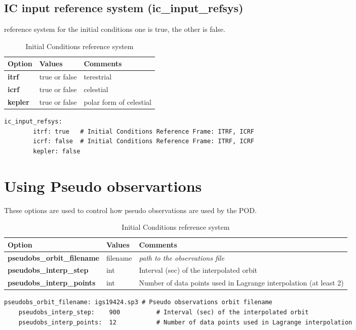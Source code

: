 \subsection{IC input reference system (ic\_input\_refsys)}
reference system for the initial conditions one is true, the other is false. 
\begin{table}[h!]
	\begin{tabular}{|p{4.5cm}|p{2cm}|p{3.5cm}|}
		\hline
		Option & Values & Comments \\
		\hline
		\textbf{itrf} & true or false & terestrial\\
		\textbf{icrf} & true or false & celestial \\
		\textbf{kepler} & true or false & polar form of celestial\\
		\hline
	\end{tabular}
	\caption{Initial Conditions reference system}
	\label{table:yaml}
\end{table}
%
{\small
\begin{lstlisting}[language=xml,caption=ic\_input\_refsys yaml configuration example]
   ic_input_refsys:
		itrf: true   # Initial Conditions Reference Frame: ITRF, ICRF
		icrf: false  # Initial Conditions Reference Frame: ITRF, ICRF
		kepler: false
\end{lstlisting}
}
%
\section{Using Pseudo observartions}
These options are used to control how pseudo observations are used by the POD.
 
\begin{table}[h!]
	\begin{tabular}{|p{4.5cm}|p{2cm}|p{3.5cm}|}
		\hline
		Option & Values & Comments \\
		\hline
		\textbf{pseudobs\_orbit\_filename} & filename & \emph{path to the observations file}\\
		\textbf{pseudobs\_interp\_step} & int &  Interval (sec) of the interpolated orbit\\
		\textbf{pseudobs\_interp\_points} & int & Number of data points used in Lagrange interpolation (at least 2)\\
		\hline
	\end{tabular}
	\caption{Initial Conditions reference system}
	\label{table:yaml}
\end{table}
%
{\small
\begin{lstlisting}[language=xml,caption=pseudo observation model yaml configuration example]
	pseudobs_orbit_filename: igs19424.sp3 # Pseudo observations orbit filename
	pseudobs_interp_step:    900          # Interval (sec) of the interpolated orbit
	pseudobs_interp_points:  12           # Number of data points used in Lagrange interpolation
\end{lstlisting}
}
%
